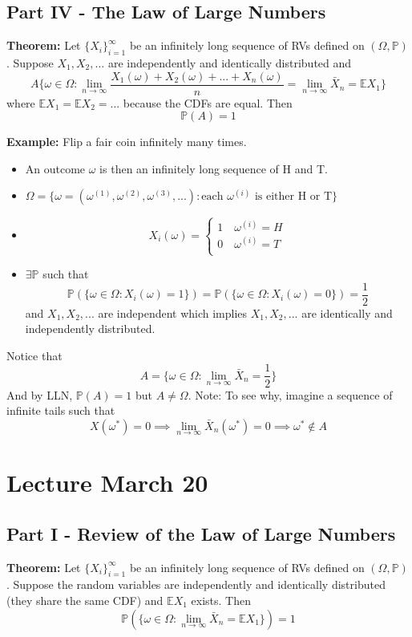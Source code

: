 \documentclass[12pt]{article}
\renewcommand{\P}{\mathbb{P}}
\newcommand{\E}{\mathbb{E}}
\begin{document}
\subsection*{Part IV - The Law of Large Numbers}
\textbf{Theorem:} Let $\{X_i\}_{i=1}^\infty$ be an infinitely long sequence of RVs defined on $(\Omega, \P)$. Suppose $X_1, X_2, ...$ are independently and identically distributed and  
\[A \{\omega \in \Omega : \lim_{n\to \infty} \frac{X_1(\omega) + X_2(\omega) + ... + X_n(\omega)}{n} = \lim_{n\to \infty} \bar{X}_n = \mathbb{E} X_1\}\]
where $\mathbb{E} X_1 = \E X_2 = ...$ because the CDFs are equal. 
Then 
\[\P(A) = 1\]

\textbf{Example:} Flip a fair coin infinitely many times. \begin{itemize}
    \item An outcome $\omega$ is then an infinitely long sequence of H and T. 
    \item $\Omega = \{\omega = (\omega^{(1)}, \omega^{(2)}, \omega^{(3)}, ...) : \text{each $\omega^{(i)}$ is either H or T}\}$
    \item  
    \[X_i(\omega) = \begin{cases}
        1 \quad \omega^{(i)} = H\\
        0 \quad \omega^{(i)} = T\\
    \end{cases}\]
    \item $\exists \P$ such that 
    \[\P(\{\omega \in \Omega: X_i(\omega) = 1\}) = \P(\{\omega \in \Omega: X_i(\omega) = 0\}) = \frac{1}{2}\]
    and $X_1, X_2, ...$ are independent which implies $X_1, X_2, ...$ are identically and independently distributed.
\end{itemize} 
Notice that 
\[A = \{\omega \in \Omega : \lim_{n \to \infty} \bar{X}_n = \frac{1}{2}\}\]
And by LLN, $\P(A) = 1$ but $A \neq \Omega$.
Note: To see why, imagine a sequence of infinite tails such that 
\[X(\omega^*) = 0 \implies \lim_{n\to \infty}\bar{X}_n(\omega^*) = 0 \implies \omega^* \notin A \]

\section*{Lecture March 20}
\subsection*{Part I - Review of the Law of Large Numbers}
\textbf{Theorem:} Let $\{X_i\}_{i=1}^\infty$ be an infinitely long sequence of RVs defined on $(\Omega, \P)$. Suppose the random variables are independently and identically distributed (they share the same CDF) and $\E X_1$ exists. Then 
\[\P\left(\{\omega \in \Omega : \lim_{n \to \infty} \bar{X}_n = \E X_1\}\right) = 1\]
\end{document}
